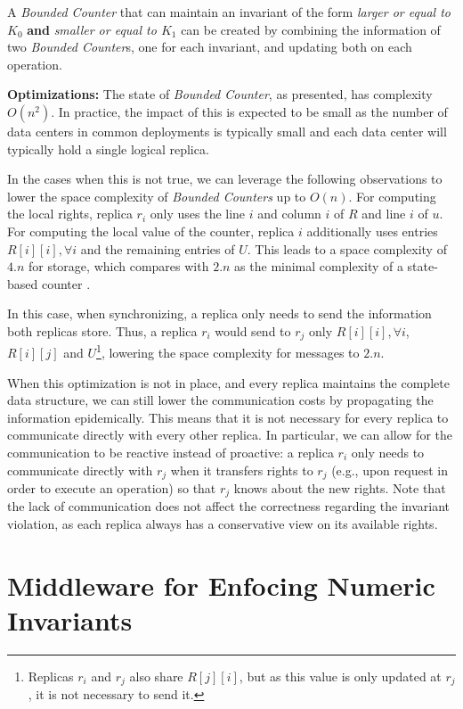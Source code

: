 \documentclass[conference]{IEEEtran}
\newcommand{\InvCounter}{\emph{Bounded Counter}}
\newcommand{\InvCounters}{\emph{Bounded Counters}}
\begin{document}
A \InvCounter{} that can maintain an invariant of the form 
\emph{larger or equal to $K_0$} {\bf and} \emph{smaller or equal to $K_1$} can 
be created by combining the information of two \InvCounter{}s, 
one for each invariant, and updating both on each operation.    



{\bf Optimizations:}
The state of \InvCounter{}, as presented, has complexity $O(n^2)$. 
In practice, the impact of this is expected to be small as the number of data
centers in common deployments is typically small and each data center will 
typically hold a single logical replica.

In the cases when this is not true, we can leverage the following observations to lower the
space complexity of \InvCounters{} up to $O(n)$.
For computing the local rights, replica $r_i$ only uses the line $i$ and column $i$ of
$R$ and line $i$ of $u$. 
For computing the local value of the counter, replica $i$ 
additionally uses entries $R[i][i], \forall i$ and the remaining entries of $U$.
This leads to a space complexity of $4.n$ for storage, which compares with $2.n$ as the minimal
complexity of a state-based counter \cite{Burckhardt14Replicated}.


In this case, when synchronizing, a replica only needs to send the information both replicas
store. Thus, a replica $r_i$ would send to $r_j$ only $R[i][i], \forall i$, 
$R[i][j]$ and $U$\footnote{Replicas $r_i$ and $r_j$ also share $R[j][i]$, but 
as this value is only updated at $r_j$, it is not necessary to send it.}, 
lowering the space complexity for messages to $2.n$.

When this optimization is not in place, and 
every replica maintains the complete data structure, we can still lower
the communication costs by propagating the information
epidemically. This means that it is not necessary for every replica to
communicate directly with every other replica.
In particular, we can allow for the communication to be reactive instead
of proactive: a replica $r_i$ only needs to communicate directly with $r_j$
when it transfers rights to $r_j$ (e.g., upon request in order to
execute an operation) so that $r_j$
knows about the new rights. Note that the lack of communication does
not affect the correctness regarding the invariant violation, as each replica 
always has a conservative view on its available rights. 



\section{Middleware for Enfocing Numeric Invariants}\label{sec:deploy:riak}
\end{document}

